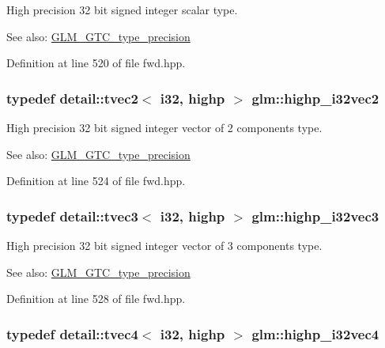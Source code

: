 High precision 32 bit signed integer scalar type. \begin{Desc}
\item[See also:]\hyperlink{group__gtc__type__precision}{GLM\_\-GTC\_\-type\_\-precision} \end{Desc}


Definition at line 520 of file fwd.hpp.\hypertarget{group__gtc__type__precision_g6020d795076243085eb0d6826c849b4a}{
\subsubsection[highp\_\-i32vec2]{\setlength{\rightskip}{0pt plus 5cm}typedef detail::tvec2$<$ i32, highp $>$ {\bf glm::highp\_\-i32vec2}}}
\label{group__gtc__type__precision_g6020d795076243085eb0d6826c849b4a}


High precision 32 bit signed integer vector of 2 components type. \begin{Desc}
\item[See also:]\hyperlink{group__gtc__type__precision}{GLM\_\-GTC\_\-type\_\-precision} \end{Desc}


Definition at line 524 of file fwd.hpp.\hypertarget{group__gtc__type__precision_g95de80f73e676fb6b9976ff0d33bbc4b}{
\subsubsection[highp\_\-i32vec3]{\setlength{\rightskip}{0pt plus 5cm}typedef detail::tvec3$<$ i32, highp $>$ {\bf glm::highp\_\-i32vec3}}}
\label{group__gtc__type__precision_g95de80f73e676fb6b9976ff0d33bbc4b}


High precision 32 bit signed integer vector of 3 components type. \begin{Desc}
\item[See also:]\hyperlink{group__gtc__type__precision}{GLM\_\-GTC\_\-type\_\-precision} \end{Desc}


Definition at line 528 of file fwd.hpp.\hypertarget{group__gtc__type__precision_g174af0fafdc5a9eb24150792bffa8b5c}{
\subsubsection[highp\_\-i32vec4]{\setlength{\rightskip}{0pt plus 5cm}typedef detail::tvec4$<$ i32, highp $>$ {\bf glm::highp\_\-i32vec4}}}
\label{group__gtc__type__precision_g174af0fafdc5a9eb24150792bffa8b5c}


